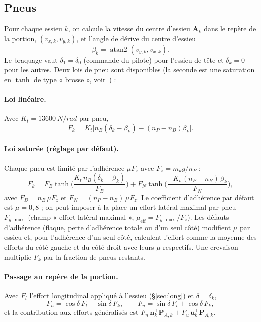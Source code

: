 \documentclass[11pt,a4paper]{article}
\newcommand{\vect}[1]{\bm{#1}}
\newcommand{\mat}[1]{\bm{#1}}
\newcommand{\T}{^{\!\top}}
\begin{document}
\subsection{Pneus}
Pour chaque essieu $k$, on calcule la vitesse du centre d'essieu $\vect A_k$ dans le repère de la portion, $(v_{x,k},v_{y,k})$, et l'angle de dérive du centre d'essieu
\begin{equation}
 \beta_k=\operatorname{atan2}(v_{y,k},v_{x,k}).
\end{equation}
Le braquage vaut $\delta_1=\delta_0$ (commande du pilote) pour l'essieu de tête et $\delta_k=0$ pour les autres. Deux lois de pneu sont disponibles (la seconde est une saturation en $\tanh$ de type « brosse », voir~\cite{Pacejka2012,Kiencke2005}) :

\paragraph{Loi linéaire.} Avec $K_t=\SI{13600}{N/rad}$ par pneu,
\begin{equation}
 F_k=K_t\big[n_B(\delta_k-\beta_k)-(n_P-n_B)\beta_k\big].
\end{equation}

\paragraph{Loi saturée (réglage par défaut).} Chaque pneu est limité par l'adhérence $\mu F_z$ avec $F_z=m_kg/n_P$ :
\begin{equation}
 F_k=F_B\tanh\!\Big(\frac{K_t\,n_B(\delta_k-\beta_k)}{F_B}\Big)+F_N\tanh\!\Big(\frac{-K_t\,(n_P-n_B)\,\beta_k}{F_N}\Big),
\end{equation}
avec $F_B=n_B\,\mu F_z$ et $F_N=(n_P-n_B)\,\mu F_z$. Le coefficient d'adhérence par défaut est $\mu=0{,}8$ ; on peut imposer à la place un effort latéral maximal par pneu $F_{y,\max}$ (champ « effort latéral maximal », $\mu_{\text{eff}}=F_{y,\max}/F_z$). Les défauts d'adhérence (flaque, perte d'adhérence totale ou d'un seul côté) modifient $\mu$ par essieu et, pour l'adhérence d'un seul côté, calculent l'effort comme la moyenne des efforts du côté gauche et du côté droit avec leurs $\mu$ respectifs. Une crevaison multiplie $F_k$ par la fraction de pneus restants.

\paragraph{Passage au repère de la portion.} Avec $F_l$ l'effort longitudinal appliqué à l'essieu (§\ref{sec:long}) et $\delta=\delta_k$,
\begin{equation}
 F_n=\cos\delta\,F_l-\sin\delta\,F_k,\qquad F_u=\sin\delta\,F_l+\cos\delta\,F_k,
\end{equation}
et la contribution aux efforts généralisés est $F_n\,\vect n_k\T\mat P_{A,k}+F_u\,\vect u_k\T\mat P_{A,k}$.
\end{document}
